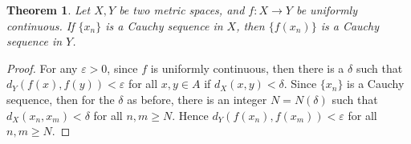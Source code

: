 \documentclass[10pt]{book}
\newtheorem{theorem}{Theorem}[chapter]
\theoremstyle{definition}
\numberwithin{equation}{chapter}
\begin{document}
\medskip

\begin{theorem}\label{th_315_added}
Let $X,Y$ be two metric spaces, and $f: X \to Y$ be uniformly continuous. If $\{x_n\}$ is a Cauchy sequence in $X$, then $\{f(x_n)\}$ is a Cauchy sequence in $Y$.
\end{theorem}
\begin{proof}
For any $\varepsilon > 0$, since $f$ is uniformly continuous, then there is a $\delta$ such that $d_Y(f(x), f(y)) < \varepsilon$ for all $x,y \in A$ if $d_X(x,y) < \delta$. Since $\{x_n\}$ is a Cauchy sequence, then for the $\delta$ as before, there is an integer $N = N(\delta)$ such that $d_X(x_n, x_m) < \delta$ for all $n,m \geq N$. Hence $d_Y(f(x_n),f(x_m)) < \varepsilon$ for all $n, m \geq N$.
\end{proof}

\medskip
\end{document}
